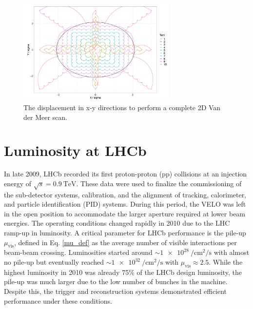 \begin{figure}
    \centering
    \includegraphics[width=0.7\textwidth]{figures/vdm_steps_xy.png}
    \caption{The displacement in x-y directions to perform a complete 2D Van der Meer scan.}
    \label{fig:vdm_steps_xy}
\end{figure}



\section{Luminosity at LHCb}
In late 2009, LHCb recorded its first proton-proton (pp) collisions at an injection energy of $\sqrt{s}=\SI{0.9}{\tera\eV}$. These data were used to finalize the commissioning of the sub-detector systems, calibration, and the alignment of tracking, calorimeter, and particle identification (PID) systems. During this period, the VELO was left in the open position to accommodate the larger aperture required at lower beam energies.
The operating conditions changed rapidly in 2010 due to the LHC ramp-up in luminosity. A critical parameter for LHCb performance is the pile-up \(\mu_{\text{vis}}\), defined in Eq. \ref{mu_def} as the average number of visible interactions per beam-beam crossing. Luminosities started around $\sim \SI{1e28}{\per\centi\meter\squared\per\second}$ with almost no pile-up but eventually reached $\sim \SI{1e32}{\per\centi\meter\squared\per\second}$ with $\mu_{\text{vis}} \approx 2.5$.
While the highest luminosity in 2010 was already 75\% of the LHCb design luminosity, the pile-up was much larger due to the low number of bunches in the machine. Despite this, the trigger and reconstruction systems demonstrated efficient performance under these conditions\cite{det_perf}.


